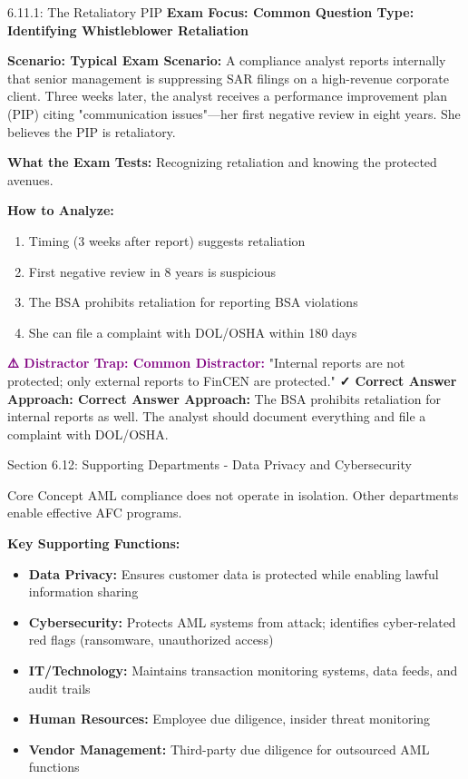\documentclass[11pt,a4paper]{beamer}
\newcommand{\examfocus}[1]{\textcolor{orange!80!black}{\textbf{Exam Focus: #1}}}
\newcommand{\trap}[1]{\textcolor{purple}{\textbf{⚠️ Distractor Trap: #1}}}
\newcommand{\correct}[1]{\textcolor{green!50!black}{\textbf{✓ Correct Answer Approach: #1}}}
\newcommand{\scenario}[1]{\textcolor{blue!70!black}{\textbf{Scenario: #1}}}
\begin{document}
	\begin{frame}{6.11.1: The Retaliatory PIP}
		\examfocus{Common Question Type: Identifying Whistleblower Retaliation}
		
		\scenario{Typical Exam Scenario:}
		A compliance analyst reports internally that senior management is suppressing SAR filings on a high-revenue corporate client. Three weeks later, the analyst receives a performance improvement plan (PIP) citing "communication issues"—her first negative review in eight years. She believes the PIP is retaliatory.
		
		\textbf{What the Exam Tests:} Recognizing retaliation and knowing the protected avenues.
		
		\textbf{How to Analyze:}
		\begin{enumerate}
			\item Timing (3 weeks after report) suggests retaliation
			\item First negative review in 8 years is suspicious
			\item The BSA prohibits retaliation for reporting BSA violations
			\item She can file a complaint with DOL/OSHA within 180 days
		\end{enumerate}
		
		\trap{Common Distractor:} "Internal reports are not protected; only external reports to FinCEN are protected."
		\correct{Correct Answer Approach:} The BSA prohibits retaliation for internal reports as well. The analyst should document everything and file a complaint with DOL/OSHA.
	\end{frame}
	
	
	\begin{frame}{Section 6.12: Supporting Departments - Data Privacy and Cybersecurity}
		\begin{block}{Core Concept}
			AML compliance does not operate in isolation. Other departments enable effective AFC programs.
		\end{block}
		\textbf{Key Supporting Functions:}
		\begin{itemize}
			\item \textbf{Data Privacy:} Ensures customer data is protected while enabling lawful information sharing
			\item \textbf{Cybersecurity:} Protects AML systems from attack; identifies cyber-related red flags (ransomware, unauthorized access)
			\item \textbf{IT/Technology:} Maintains transaction monitoring systems, data feeds, and audit trails
			\item \textbf{Human Resources:} Employee due diligence, insider threat monitoring
			\item \textbf{Vendor Management:} Third-party due diligence for outsourced AML functions
		\end{itemize}
	\end{frame}
	
\end{document}

